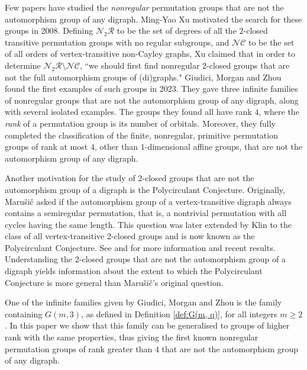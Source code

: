 \documentclass[10pt]{amsart}
\theoremstyle{definition}
\theoremstyle{plain}
\theoremstyle{plain}
\theoremstyle{plain}
\theoremstyle{plain}
\begin{document}
Few papers have studied the \emph{nonregular} permutation groups that are not the automorphism group of any digraph. Ming-Yao Xu \cite{ref:xu-regular-subgroups} motivated the search for these groups in 2008. Defining $\mathcal{N}_2 \mathcal{R}$ to be the set of degrees of all the $2$-closed transitive permutation groups with no regular subgroups, and $\mathcal{NC}$ to be the set of all orders of vertex-transitive non-Cayley graphs, Xu claimed that in order to determine $\mathcal{N}_2 \mathcal{R} \setminus \mathcal{NC}$, ``we should first find nonregular 2-closed groups that are not the full automorphism groups of (di)graphs." Giudici, Morgan and Zhou \cite{ref:giudici-primitive} found the first examples of such groups in 2023. They gave three infinite families of nonregular groups that are not the automorphism group of any digraph, along with several isolated examples. The groups they found all have rank $4$, where the \emph{rank} of a permutation group is its number of orbitals. Moreover, they fully completed the classification of the finite, nonregular, primitive permutation groups of rank at most $4$, other than $1$-dimensional affine groups, that are not the automorphism group of any digraph.

Another motivation for the study of 2-closed groups that are not the automorphism group of a digraph is the Polycirculant Conjecture. Originally, Maru\v{s}i\v{c} \cite{ref:marusic-vertex} asked if the automorphism group of a vertex-transitive digraph always contains a semiregular permutation, that is, a nontrivial permutation with all cycles having the same length.  This question was later extended by Klin \cite{ref:cameron-research} to the class of all vertex-transitive 2-closed groups and is now known as the Polycirculant Conjecture. See \cite{ref:cameron-transitive} and \cite{ref:arezoomand-polycirculant} for more information and recent results. Understanding the 2-closed groups that are not the automorphism group of a digraph yields information about the extent to which the Polycirculant Conjecture is more general than Maru\v{s}i\v{c}'s original question.

One of the infinite families given by Giudici, Morgan and Zhou \cite{ref:giudici-primitive} is the family containing $G{\left(m, 3 \right)}$, as defined in Definition \ref{def:G(m, q)}, for all integers $m \geqslant 2$. In this paper we show that this family can be generalised to groups of higher rank with the same properties, thus giving the first known nonregular permutation groups of rank greater than $4$ that are not the automorphism group of any digraph.
\end{document}
